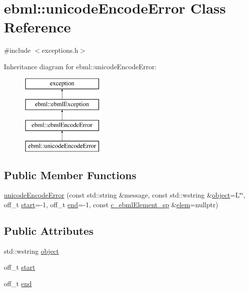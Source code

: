 \hypertarget{classebml_1_1unicodeEncodeError}{}\section{ebml\+:\+:unicode\+Encode\+Error Class Reference}
\label{classebml_1_1unicodeEncodeError}


{\ttfamily \#include $<$exceptions.\+h$>$}

Inheritance diagram for ebml\+:\+:unicode\+Encode\+Error\+:\begin{figure}[H]
\begin{center}
\leavevmode
\includegraphics[height=4.000000cm]{classebml_1_1unicodeEncodeError}
\end{center}
\end{figure}
\subsection*{Public Member Functions}
\begin{DoxyCompactItemize}
\item 
\mbox{\hyperlink{classebml_1_1unicodeEncodeError_add93df3ec50e31cf17faf8170498e391}{unicode\+Encode\+Error}} (const std\+::string \&message, const std\+::wstring \&\mbox{\hyperlink{classebml_1_1unicodeEncodeError_a15a0fc868f0a45d61042220927ed17eb}{object}}=L\char`\"{}\char`\"{}, off\+\_\+t \mbox{\hyperlink{classebml_1_1unicodeEncodeError_a21775eb92e0b457166aa64892816fe68}{start}}=-\/1, off\+\_\+t \mbox{\hyperlink{classebml_1_1unicodeEncodeError_a99ec2d13b0fa0d978fe208ea45d10dba}{end}}=-\/1, const \mbox{\hyperlink{namespaceebml_a2deef4e8071531b32e3533f1bf978917}{c\+\_\+ebml\+Element\+\_\+sp}} \&\mbox{\hyperlink{classebml_1_1ebmlEncodeError_acea050cc554e717e4d9845c0cf34d473}{elem}}=nullptr)
\end{DoxyCompactItemize}
\subsection*{Public Attributes}
\begin{DoxyCompactItemize}
\item 
std\+::wstring \mbox{\hyperlink{classebml_1_1unicodeEncodeError_a15a0fc868f0a45d61042220927ed17eb}{object}}
\item 
off\+\_\+t \mbox{\hyperlink{classebml_1_1unicodeEncodeError_a21775eb92e0b457166aa64892816fe68}{start}}
\item 
off\+\_\+t \mbox{\hyperlink{classebml_1_1unicodeEncodeError_a99ec2d13b0fa0d978fe208ea45d10dba}{end}}
\end{DoxyCompactItemize}


